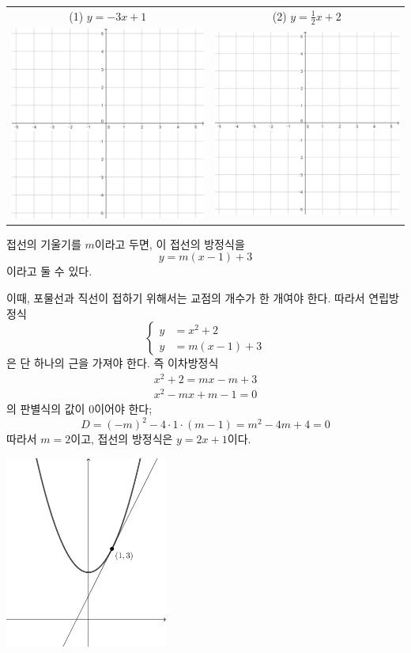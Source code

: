\documentclass{oblivoir}
\begin{document}
%
\begin{center}
\begin{tabular}{cc}
(1) \(y=-3x+1\)
&(2) \(y=\frac12x+2\)\\
\includegraphics[width=.35\textwidth]{55}
&\includegraphics[width=.35\textwidth]{55}
\end{tabular}
\end{center}

%

\begin{mdframed}
접선의 기울기를 \(m\)이라고 두면, 이 접선의 방정식을
\[y=m(x-1)+3\]
이라고 둘 수 있다.

이때, 포물선과 직선이 접하기 위해서는 교점의 개수가 한 개여야 한다.
따라서 연립방정식
\[\begin{cases}
y&=x^2+2\\
y&=m(x-1)+3
\end{cases}\]
은 단 하나의 근을 가져야 한다.
즉 이차방정식
\begin{gather*}
x^2+2=mx-m+3\\
x^2-mx+m-1=0
\end{gather*}
의 판별식의 값이 0이어야 한다;
\[D=(-m)^2-4\cdot1\cdot(m-1)=m^2-4m+4=0\]
따라서 \(m=2\)이고, 접선의 방정식은 \(y=2x+1\)이다.
\end{mdframed}
\begin{center}
\includegraphics[width=0.4\textwidth]{tangent}
\end{center}
\end{document}
